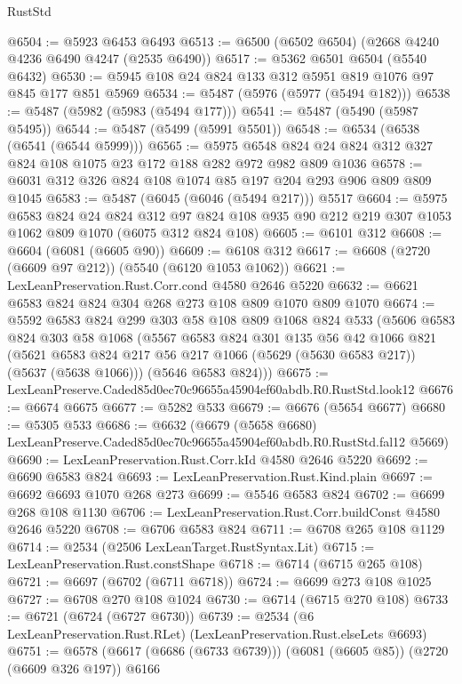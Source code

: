 \begin{lexlean}{RustStd}
\begin{coremodule}
@6504 := @5923 @6453 @6493
@6513 := @6500 (@6502 @6504) (@2668 @4240 @4236 @6490 @4247 (@2535 @6490))
@6517 := @5362 @6501 @6504 (@5540 @6432)
@6530 := @5945 @108 @24 @824 @133 @312 @5951 @819 @1076 @97 @845 @177 @851 @5969
@6534 := @5487 (@5976 (@5977 (@5494 @182)))
@6538 := @5487 (@5982 (@5983 (@5494 @177)))
@6541 := @5487 (@5490 (@5987 @5495))
@6544 := @5487 (@5499 (@5991 @5501))
@6548 := @6534 (@6538 (@6541 (@6544 @5999)))
@6565 := @5975 @6548 @824 @24 @824 @312 @327 @824 @108 @1075 @23 @172 @188 @282 @972 @982 @809 @1036
@6578 := @6031 @312 @326 @824 @108 @1074 @85 @197 @204 @293 @906 @809 @809 @1045
@6583 := @5487 (@6045 (@6046 (@5494 @217))) @5517
@6604 := @5975
    @6583
    @824
    @24
    @824
    @312
    @97
    @824
    @108
    @935
    @90
    @212
    @219
    @307
    @1053
    @1062
    @809
    @1070
    (@6075 @312 @824 @108)
@6605 := @6101 @312
@6608 := @6604 (@6081 (@6605 @90))
@6609 := @6108 @312
@6617 := @6608 (@2720 (@6609 @97 @212)) (@5540 (@6120 @1053 @1062))
@6621 := LexLeanPreservation.Rust.Corr.cond @4580 @2646 @5220
@6632 := @6621 @6583 @824 @824 @304 @268 @273 @108 @809 @1070 @809 @1070
@6674 := @5592
    @6583
    @824
    @299
    @303
    @58
    @108
    @809
    @1068
    @824
    @533
    (@5606
      @6583
      @824
      @303
      @58
      @1068
      (@5567
        @6583
        @824
        @301
        @135
        @56
        @42
        @1066
        @821
        (@5621 @6583 @824 @217 @56 @217 @1066 (@5629 (@5630 @6583 @217)) (@5637 (@5638 @1066)))
        (@5646 @6583 @824)))
@6675 := LexLeanPreserve.Caded85d0ec70c96655a45904ef60abdb.R0.RustStd.look12
@6676 := @6674 @6675
@6677 := @5282 @533
@6679 := @6676 (@5654 @6677)
@6680 := @5305 @533
@6686 := @6632
    (@6679 (@5658 @6680) LexLeanPreserve.Caded85d0ec70c96655a45904ef60abdb.R0.RustStd.fal12 @5669)
@6690 := LexLeanPreservation.Rust.Corr.kId @4580 @2646 @5220
@6692 := @6690 @6583 @824
@6693 := LexLeanPreservation.Rust.Kind.plain
@6697 := @6692 @6693 @1070 @268 @273
@6699 := @5546 @6583 @824
@6702 := @6699 @268 @108 @1130
@6706 := LexLeanPreservation.Rust.Corr.buildConst @4580 @2646 @5220
@6708 := @6706 @6583 @824
@6711 := @6708 @265 @108 @1129
@6714 := @2534 (@2506 LexLeanTarget.RustSyntax.Lit)
@6715 := LexLeanPreservation.Rust.constShape
@6718 := @6714 (@6715 @265 @108)
@6721 := @6697 (@6702 (@6711 @6718))
@6724 := @6699 @273 @108 @1025
@6727 := @6708 @270 @108 @1024
@6730 := @6714 (@6715 @270 @108)
@6733 := @6721 (@6724 (@6727 @6730))
@6739 := @2534 (@6 LexLeanPreservation.Rust.RLet) (LexLeanPreservation.Rust.elseLets @6693)
@6751 := @6578 (@6617 (@6686 (@6733 @6739))) (@6081 (@6605 @85)) (@2720 (@6609 @326 @197)) @6166

\end{coremodule}
\end{lexlean}
